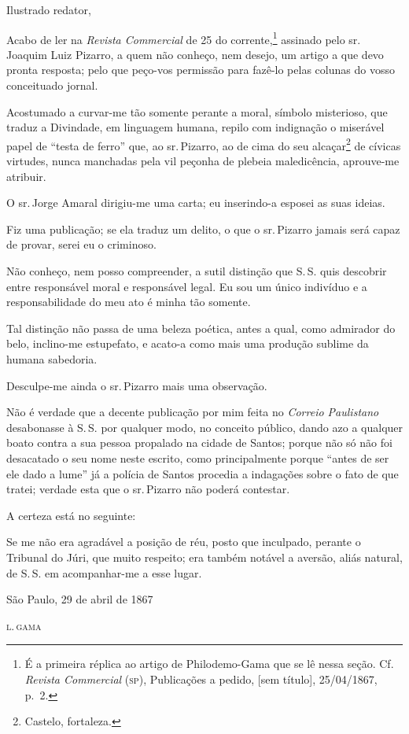 Ilustrado redator,

Acabo de ler na \emph{Revista Commercial} de 25 do
corrente,\footnote{ É a primeira réplica ao artigo
  de Philodemo-Gama que se lê nessa seção. Cf. \emph{Revista Commercial}
  (\textsc{sp}), Publicações a pedido, {[}sem título{]}, 25/04/1867, p.~2.}
assinado pelo sr.\,Joaquim Luiz Pizarro, a quem não conheço, nem desejo,
um artigo a que devo pronta resposta; pelo que peço-vos permissão para
fazê-lo pelas colunas do vosso conceituado jornal.

Acostumado a curvar-me tão somente perante a moral, símbolo misterioso,
que traduz a Divindade, em linguagem humana, repilo com indignação o
miserável papel de ``testa de ferro'' que, ao sr.\,Pizarro, ao de cima do
seu alcaçar\footnote{Castelo, fortaleza.} de cívicas
virtudes, nunca manchadas pela vil peçonha de plebeia maledicência,
aprouve-me atribuir.

O sr.\,Jorge Amaral dirigiu-me uma carta; eu inserindo-a esposei as suas
ideias.

Fiz uma publicação; se ela traduz um delito, o que o sr.\,Pizarro jamais
será capaz de provar, serei eu o criminoso.

Não conheço, nem posso compreender, a sutil distinção que S.\,S. quis
descobrir entre responsável moral e responsável legal. Eu sou um único
indivíduo e a responsabilidade do meu ato é minha tão somente.

Tal distinção não passa de uma beleza poética, antes a qual, como
admirador do belo, inclino-me estupefato, e acato-a como mais uma
produção sublime da humana sabedoria.

Desculpe-me ainda o sr.\,Pizarro mais uma observação.

Não é verdade que a decente publicação por mim feita no \emph{Correio
Paulistano} desabonasse à S.\,S. por qualquer modo, no conceito público,
dando azo a qualquer boato contra a sua pessoa propalado na cidade de
Santos; porque não só não foi desacatado o seu nome neste escrito, como
principalmente porque ``antes de ser ele dado a lume'' já a polícia de
Santos procedia a indagações sobre o fato de que tratei; verdade esta
que o sr.\,Pizarro não poderá contestar.

A certeza está no seguinte:

Se me não era agradável a posição de réu, posto que inculpado, perante o
Tribunal do Júri, que muito respeito; era também notável a aversão,
aliás natural, de S.\,S. em acompanhar-me a esse lugar.

\begin{flushright}
São Paulo, 29 de abril de 1867

\textsc{l.\,gama}
\end{flushright}

